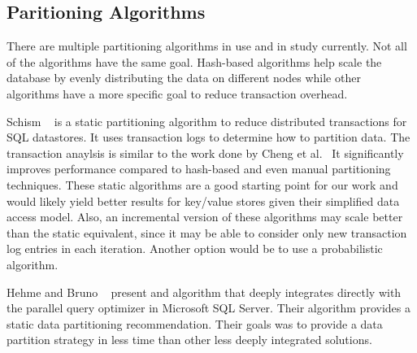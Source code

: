 \subsection{Paritioning Algorithms}
There are multiple partitioning algorithms in use and in study currently.  Not all of the algorithms have the same goal.  Hash-based algorithms help scale the database by evenly distributing the data on different nodes while other algorithms have a more specific goal to reduce transaction overhead.

Schism ~\cite{Curino:2010:SWA:1920841.1920853} is a static partitioning algorithm to reduce distributed transactions for SQL datastores. It uses transaction logs to determine how to partition data. The transaction anaylsis is similar to the work done by Cheng et al.~\cite{Cheng:2002} It significantly improves performance compared to hash-based and even manual partitioning techniques. These static algorithms are a good starting point for our work and would likely yield better results for key/value stores given their simplified data access model. Also, an incremental version of these algorithms may scale better than the static equivalent, since it may be able to consider only new transaction log entries in each iteration. Another option would be to use a probabilistic algorithm.

Hehme and Bruno ~\cite{Nehme:2011:APD:1989323.1989444} present and algorithm that deeply integrates directly with the parallel query optimizer in Microsoft SQL Server.  Their algorithm provides a static data partitioning recommendation.  Their goals was to provide a data partition strategy in less time than other less deeply integrated solutions.

